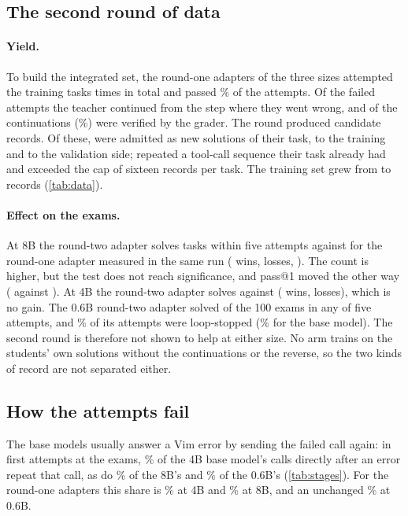 \subsection{The second round of data}
\paragraph{Yield.} To build the integrated set, the round-one adapters of the three sizes attempted the training tasks
\recoveryAttempts{} times in total and passed \recoveryPassPct{}\% of the attempts. Of the \recoveryFailed{} failed
attempts the teacher continued \recoveryContinued{} from the step where they went wrong, and \recoverySolved{} of the
continuations (\recoverySolvedPct{}\%) were verified by the grader. The round produced \integrationCandidates{}
candidate records. Of these, \integrationAdmitted{} were admitted as new solutions of their
task, \integrationTrainAdded{} to the training and \integrationValidationAdded{} to the validation side;
\integrationDuplicate{} repeated a tool-call sequence their task already had and \integrationOvercap{} exceeded the cap
of sixteen records per task. The training set grew from \integrationTrainBefore{} to \integrationTrainAfter{} records
(\cref{tab:data}).

\paragraph{Effect on the exams.} At 8B the round-two adapter solves \examEightRtwoFive{} tasks within five attempts
against \examEightRtworefFive{} for the round-one adapter measured in the same run (\winsEightRtwo{} wins,
\lossesEightRtwo{} losses, \ptestEightRtwo{}). The count is higher, but the test does not reach significance, and
pass@1 moved the other way (\examEightRtwoOne{} against \examEightRtworefOne{}). At 4B the round-two adapter solves
\examFourRtwoFive{} against \examFourRtworefFive{} (\winsFourRtwo{} wins, \lossesFourRtwo{} losses), which is no gain. The 0.6B round-two adapter solved \examZeroRtwoFive{} of the 100 exams in any
of five attempts, and \behaviourZeroRtwoExamLoopPct{}\% of its attempts were loop-stopped (\behaviourZeroBaseExamLoopPct{}\% for the
base model).
The second round is therefore not shown to help at either size. No arm trains on the students' own solutions without
the continuations or the reverse, so the two kinds of record are not separated either.

\subsection{How the attempts fail}
The base models usually answer a Vim error by sending the failed call again: in first attempts at the exams,
\behaviourFourBaseExamRepeatPct{}\% of the 4B base model's calls directly after an error repeat that call, as do
\behaviourEightBaseExamRepeatPct{}\% of the 8B's and \behaviourZeroBaseExamRepeatPct{}\% of the 0.6B's
(\cref{tab:stages}). For the round-one adapters this share is \behaviourFourFullExamRepeatPct{}\% at 4B and
\behaviourEightFullExamRepeatPct{}\% at 8B, and an unchanged \behaviourZeroFullExamRepeatPct{}\% at 0.6B.

